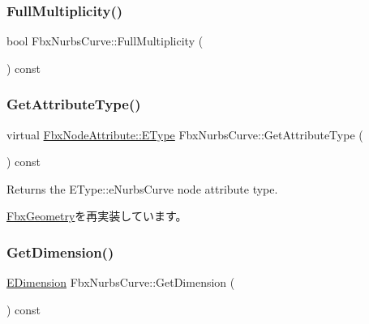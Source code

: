 \subsubsection{\texorpdfstring{Full\+Multiplicity()}{FullMultiplicity()}}
{\footnotesize\ttfamily bool Fbx\+Nurbs\+Curve\+::\+Full\+Multiplicity (\begin{DoxyParamCaption}{ }\end{DoxyParamCaption}) const}

\mbox{\label{class_fbx_nurbs_curve_aa6ec087af306c42ac814d43ea80c60b3}} 
\subsubsection{\texorpdfstring{Get\+Attribute\+Type()}{GetAttributeType()}}
{\footnotesize\ttfamily virtual \hyperlink{class_fbx_node_attribute_a08e1669d3d1a696910756ab17de56d6a}{Fbx\+Node\+Attribute\+::\+E\+Type} Fbx\+Nurbs\+Curve\+::\+Get\+Attribute\+Type (\begin{DoxyParamCaption}{ }\end{DoxyParamCaption}) const\hspace{0.3cm}{\ttfamily [virtual]}}



Returns the E\+Type\+::e\+Nurbs\+Curve node attribute type. 



\hyperlink{class_fbx_geometry_a41ae23e5d0cf08693bca49737f333de9}{Fbx\+Geometry}を再実装しています。

\mbox{\label{class_fbx_nurbs_curve_a3f08d738ff4b1ca4a521fa4be2359990}} 
\subsubsection{\texorpdfstring{Get\+Dimension()}{GetDimension()}}
{\footnotesize\ttfamily \hyperlink{class_fbx_nurbs_curve_a95d4a63cff6dd62901ea39c268336122}{E\+Dimension} Fbx\+Nurbs\+Curve\+::\+Get\+Dimension (\begin{DoxyParamCaption}{ }\end{DoxyParamCaption}) const\hspace{0.3cm}{\ttfamily [inline]}}

